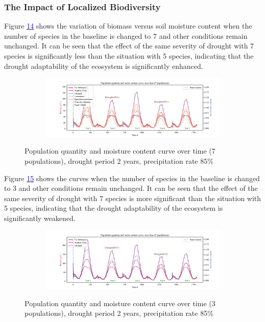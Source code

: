\documentclass{mcmthesis}
\begin{document}
\subsubsection{The Impact of Localized Biodiversity}

\indent

Figure \hyperref[fig:7_2_85]{\textcolor{blue}{14}} shows the variation of biomass versus soil moisture content when the number of species in the baseline is changed to 7 and other conditions remain unchanged. It can be seen that the effect of the same severity of drought with 7 species is significantly less than the situation with 5 species, indicating that the drought adaptability of the ecosystem is significantly enhanced.

\begin{figure}[h]
\centering 
\begin{subfigure}{ 0.95\textwidth}
\includegraphics[width=\textwidth]{img/7_2_85.pdf}
\end{subfigure}
\caption{Population quantity and moisture content curve over time (7 populations), drought period $2$ years, precipitation rate 85\%}
\label{fig:7_2_85}
\end{figure}

Figure \hyperref[fig:3_2_85]{\textcolor{blue}{15}} shows the curves when the number of species in the baseline is changed to 3 and other conditions remain unchanged. It can be seen that the effect of the same severity of drought with 7 species is more significant than the situation with 5 species, indicating that the drought adaptability of the ecosystem is significantly weakened.

\begin{figure}[h]
\centering 
\begin{subfigure}{ 0.92\textwidth}
\includegraphics[width=\textwidth]{img/3_2_85.pdf}
\end{subfigure}
\caption{Population quantity and moisture content curve over time (3 populations), drought period 2 years, precipitation rate 85\%}
\label{fig:3_2_85}
\end{figure}
\end{document}
